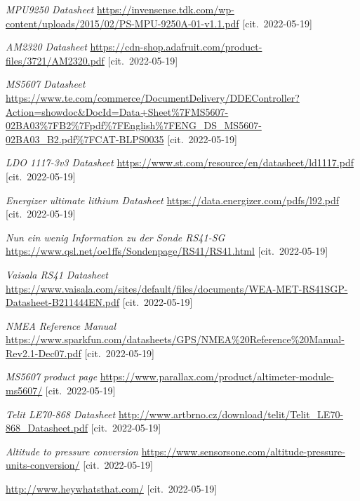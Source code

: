 \documentclass[twoside]{ctuthesis}
\theoremstyle{plain}
\theoremstyle{definition}
\theoremstyle{note}
\begin{document}
\begin{thebibliography}{1}
	\textit{MPU9250 Datasheet}
	\url{https://invensense.tdk.com/wp-content/uploads/2015/02/PS-MPU-9250A-01-v1.1.pdf} [cit.~2022-05-19]

	\textit{AM2320 Datasheet}
	\url{https://cdn-shop.adafruit.com/product-files/3721/AM2320.pdf} [cit.~2022-05-19]

	\textit{MS5607 Datasheet}
	\url{https://www.te.com/commerce/DocumentDelivery/DDEController?Action=showdoc&DocId=Data+Sheet%7FMS5607-02BA03%7FB2%7Fpdf%7FEnglish%7FENG_DS_MS5607-02BA03_B2.pdf%7FCAT-BLPS0035} [cit.~2022-05-19]

	\textit{LDO 1117-3v3 Datasheet}
	\url{https://www.st.com/resource/en/datasheet/ld1117.pdf} [cit.~2022-05-19]

	\textit{Energizer ultimate lithium Datasheet}
	\url{https://data.energizer.com/pdfs/l92.pdf} [cit.~2022-05-19]

	\textit{Nun ein wenig Information zu der Sonde RS41-SG}
	\url{https://www.qsl.net/oe1ffs/Sondenpage/RS41/RS41.html} [cit.~2022-05-19]

	\textit{Vaisala RS41 Datasheet}
	\url{https://www.vaisala.com/sites/default/files/documents/WEA-MET-RS41SGP-Datasheet-B211444EN.pdf} [cit.~2022-05-19]

	\textit{NMEA Reference Manual}
	\url{https://www.sparkfun.com/datasheets/GPS/NMEA%20Reference%20Manual-Rev2.1-Dec07.pdf} [cit.~2022-05-19]


	\textit{MS5607 product page}
	\url{https://www.parallax.com/product/altimeter-module-ms5607/} [cit.~2022-05-19]

	\textit{Telit LE70-868 Datasheet}
	\url{http://www.artbrno.cz/download/telit/Telit_LE70-868_Datasheet.pdf} [cit.~2022-05-19]

	\textit{Altitude to pressure conversion}
	\url{https://www.sensorsone.com/altitude-pressure-units-conversion/} [cit.~2022-05-19]

	\url{http://www.heywhatsthat.com/} [cit.~2022-05-19]




\end{thebibliography}
%
%

\end{document}
